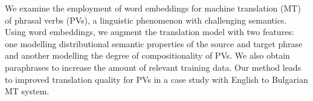 We examine the employment of word embeddings for machine translation (MT) of phrasal verbs (PVs), a linguistic phenomenon with challenging semantics. Using word embeddings, we augment the translation model with two features: one modelling distributional semantic properties of the source and target phrase and another modelling the degree of compositionality of PVs.  We also obtain paraphrases to increase the amount of relevant training data. Our method leads to improved translation quality for PVs in a case study with English to Bulgarian MT system.
